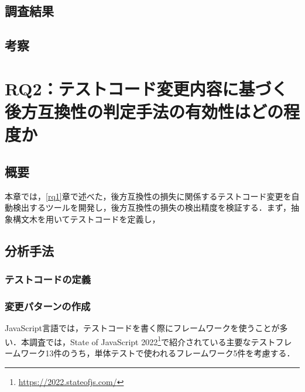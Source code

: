 \documentclass[11pt,dvipdfmx]{jreport}
\begin{document}
\section{調査結果}



\section{考察}

\chapter{RQ2：テストコード変更内容に基づく後方互換性の判定手法の有効性はどの程度か}

\section{概要}
本章では，\ref{rq1}章で述べた，後方互換性の損失に関係するテストコード変更を自動検出するツールを開発し，後方互換性の損失の検出精度を検証する．まず，抽象構文木を用いてテストコードを定義し，







\section{分析手法}

\subsection{テストコードの定義}

\subsection{変更パターンの作成}
JavaScript言語では，テストコードを書く際にフレームワークを使うことが多い．本調査では，State of JavaScript 2022\footnote{\url{https://2022.stateofjs.com/}}で紹介されている主要なテストフレームワーク13件のうち，単体テストで使われるフレームワーク5件を考慮する．
\end{document}
